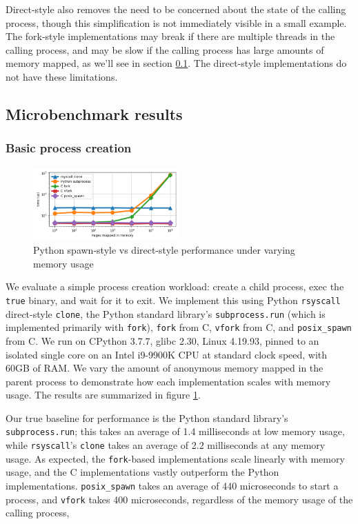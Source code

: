 \documentclass[letterpaper,twocolumn,10pt]{article}
\begin{document}
Direct-style also removes the need to be concerned about the state of the calling process,
though this simplification is not immediately visible in a small example.
The fork-style implementations may break if there are multiple threads in the calling process,
and may be slow if the calling process has large amounts of memory mapped, as we'll see in section \ref{subprocess_bench}.
The direct-style implementations do not have these limitations.
\subsection{Microbenchmark results}\label{subprocess_bench}
\subsubsection{Basic process creation}
\begin{figure}[h!]
\centering
 \includegraphics[width=0.5\textwidth]{subprocess_bench}
 \caption{Python spawn-style vs direct-style performance under varying memory usage}
 \label{fig:subprocess_bench}
\end{figure}
We evaluate a simple process creation workload:
create a child process, exec the \texttt{true} binary, and wait for it to exit.
We implement this using Python \texttt{rsyscall} direct-style \texttt{clone},
the Python standard library's \texttt{subprocess.run} (which is implemented primarily with \texttt{fork}),
\texttt{fork} from C,
\texttt{vfork} from C,
and \texttt{posix\_spawn} from C.
We run on CPython 3.7.7, glibc 2.30, Linux 4.19.93,
pinned to an isolated single core on an Intel i9-9900K CPU at standard clock speed,
with 60GB of RAM.
We vary the amount of anonymous memory mapped in the parent process
to demonstrate how each implementation scales with memory usage.
The results are summarized in figure \ref{fig:subprocess_bench}.

Our true baseline for performance is the Python standard library's \texttt{subprocess.run};
this takes an average of 1.4 milliseconds at low memory usage,
while \texttt{rsyscall}'s \texttt{clone} takes an average of 2.2 milliseconds at any memory usage.
As expected, the \texttt{fork}-based implementations scale linearly with memory usage,
and the C implementations vastly outperform the Python implementations.
\texttt{posix\_spawn} takes an average of 440 microseconds to start a process,
and \texttt{vfork} takes 400 microseconds,
regardless of the memory usage of the calling process,
\end{document}
